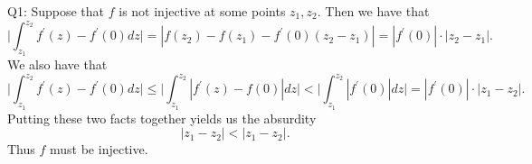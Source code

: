 \documentclass[letterpaper]{article}
\begin{document}
 \noindent Q1: 
Suppose that $f$ is not injective at some points $z_1,z_2$. Then we have that $$\Big| \int_{z_1}^{z_2} f^\prime(z) - f^\prime(0) dz\Big| = |f(z_2) - f(z_1) - f^\prime(0) (z_2-z_1)|  = |f^\prime(0)| \cdot |z_2-z_1|.$$ 
We also have that $$\Big| \int_{z_1}^{z_2} f^\prime(z) - f^\prime(0) dz\Big| \leq \Big| \int_{z_1}^{z_2} |f^\prime(z) - f(0)| dz \Big|  < \Big| \int_{z_1}^{z_2} |f^\prime(0)| dz \Big| = |f^\prime(0)| \cdot|z_1-z_2|.$$ 
Putting these two facts together yields us the absurdity $$|z_1-z_2| < |z_1 - z_2|.$$ 
Thus $f$ must be injective. 
\end{document}
